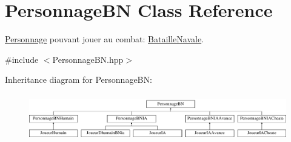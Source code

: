 \hypertarget{classPersonnageBN}{\section{Personnage\-B\-N Class Reference}
\label{classPersonnageBN}
}


\hyperlink{classPersonnage}{Personnage} pouvant jouer au combat\-: \hyperlink{classBatailleNavale}{Bataille\-Navale}.  




{\ttfamily \#include $<$Personnage\-B\-N.\-hpp$>$}

Inheritance diagram for Personnage\-B\-N\-:\begin{figure}[H]
\begin{center}
\leavevmode
\includegraphics[height=2.086957cm]{classPersonnageBN}
\end{center}
\end{figure}
